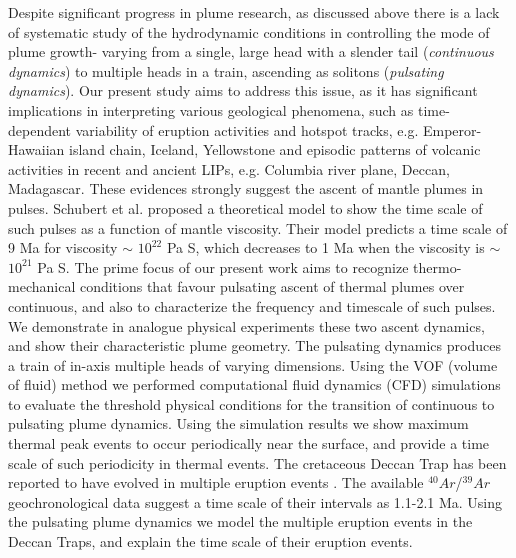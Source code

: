 \documentclass[12pt]{article}
\begin{document}
Despite significant progress in plume research, as discussed above there is a lack of systematic study of the hydrodynamic conditions in controlling the mode of plume growth- varying from a single, large head with a slender tail (\textit{continuous dynamics}) to multiple heads in a train, ascending as solitons (\textit{pulsating dynamics}). Our present study aims to address this issue, as it has significant implications in interpreting various geological phenomena, such as time-dependent variability of eruption activities and hotspot tracks, e.g. Emperor-Hawaiian island chain, Iceland, Yellowstone and episodic patterns of volcanic activities in recent and ancient LIPs, e.g. Columbia river plane, Deccan, Madagascar. These evidences strongly suggest the ascent of mantle plumes in pulses. Schubert et al. \cite{schubert1989solitary} proposed a theoretical model to show the time scale of such pulses as a function of mantle viscosity. Their model predicts a time scale of 9 Ma for viscosity $\sim$ $10^{22}$ Pa S, which decreases to 1 Ma when the viscosity is $\sim$ $10^{21}$ Pa S. The prime focus of our present work aims to recognize thermo-mechanical conditions that favour pulsating ascent of thermal plumes over continuous, and also to characterize the frequency and timescale of such pulses. We demonstrate in analogue physical experiments these two ascent dynamics, and show their characteristic plume geometry. The pulsating dynamics produces a train of in-axis multiple heads of varying dimensions. Using the VOF (volume of fluid) method we performed computational fluid dynamics (CFD) simulations to evaluate the threshold physical conditions for the transition of continuous to pulsating plume dynamics. Using the simulation results we show maximum thermal peak events to occur periodically near the surface, and provide a time scale of such periodicity in thermal events.  The cretaceous Deccan Trap has been reported to have evolved in multiple eruption events \cite{pande2002age, parisio201640ar}. The available $^{40}Ar$/$^{39}Ar$  geochronological data suggest a time scale of their intervals as 1.1-2.1 Ma. Using the pulsating plume dynamics we model the multiple eruption events in the Deccan Traps, and explain the time scale of  their eruption events.

 





\end{document}
